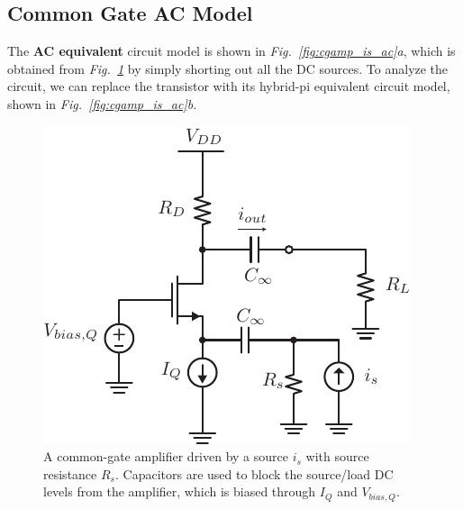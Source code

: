 \subsection{Common Gate AC Model}
The \textbf{AC equivalent} circuit model is shown in \emph{Fig.~\ref{fig:cgamp_is_ac}a}, which is obtained from \emph{Fig.~\ref{fig:cgamp_is}} by simply shorting out all the DC sources.  To analyze the circuit, we can replace the transistor with its hybrid-pi equivalent circuit model, shown in \emph{Fig.~\ref{fig:cgamp_is_ac}b}.
\newpage
\begin{figure}[t]
\centering
\includegraphics[scale=1.05]{cgamp_is}
\caption{A common-gate amplifier driven by a source $i_s$ with source resistance $R_s$.  Capacitors are used to block the source/load DC levels from the amplifier, which is biased through $I_Q$ and $V_{bias,Q}$.}
\label{fig:cgamp_is}
\end{figure}
